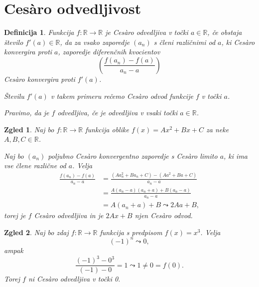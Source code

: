 \documentclass[10]{beamer}
\newtheorem{definicija}{Definicija}
\newtheorem{zgled}{Zgled}
\begin{document}
\section{Ces\`{a}ro odvedljivost}

\begin{frame}
    \begin{definicija}
        Funkcija $f: \mathbb{R} \rightarrow \mathbb{R}$ je Ces\`{a}ro odvedljiva v točki $a \in \mathbb{R}$, če obstaja število $f'(a) \in \mathbb{R}$, da za vsako zaporedje $(a_n)$ s členi različnimi od $a$, ki Ces\`{a}ro konvergira proti $a$, zaporedje diferenčnih kvocientov 
        $$(\frac{f(a_n)-f(a)}{a_n-a})$$ 
        Ces\`{a}ro konvergira proti $f'(a)$. 
        \pause

        \medskip
        Številu $f'(a)$ v takem primeru rečemo Ces\`{a}ro odvod funkcije $f$ v točki $a$. 
        \pause

        \medskip
        Pravimo, da je $f$ odvedljiva, če je odvedljiva v vsaki točki $a \in \mathbb{R}$.
    \end{definicija}
\end{frame}

\begin{frame}
    \begin{zgled}
        \label{vseodv}
        Naj bo $f: \mathbb{R} \rightarrow \mathbb{R}$ funkcija oblike $f(x) = Ax^2 + Bx + C$ za neke $A, B, C \in \mathbb{R}$. 
        \pause
        
        Naj bo $(a_n)$ poljubno Ces\`{a}ro konvergentno zaporedje s Ces\`{a}ro limito $a$, ki ima vse člene različne od $a$. 
        \pause
        Velja 
        \begin{align*}
            \frac{f(a_n)-f(a)}{a_n-a} &= \frac{(Aa_n^2 + Ba_n + C)-(Aa^2 + Ba + C)}{a_n-a}\\
            &= \frac{A(a_n-a)(a_n+a) + B(a_n-a)}{a_n-a}\\
            &= A(a_n+a) + B \leadsto 2Aa + B,
        \end{align*}
        torej je $f$ Ces\`{a}ro odvedljiva in je $2Ax + B$ njen Ces\`{a}ro odvod.
    \end{zgled}
\end{frame}

\begin{frame}
    \begin{zgled}
        Naj bo zdaj $f: \mathbb{R} \rightarrow \mathbb{R}$ funkcija s predpisom $f(x) = x^3$. Velja 
        $$(-1)^n \leadsto 0,$$ 
        ampak 
        $$\frac{(-1)^3-0^3}{(-1)-0} = 1 \leadsto 1 \neq 0 = f(0).$$ 
        Torej $f$ ni Ces\`{a}ro odvedljiva v točki 0.
    \end{zgled}
\end{frame}
\end{document}
